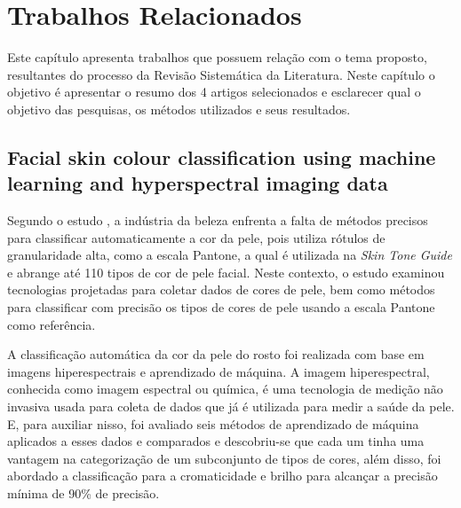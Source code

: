 \chapter{Trabalhos Relacionados}
\label{cap:trabalhos-relacionados}
Este capítulo apresenta trabalhos que possuem relação com o tema proposto, resultantes do processo da Revisão Sistemática da Literatura. Neste capítulo o objetivo é apresentar o resumo dos 4 artigos selecionados e esclarecer qual o objetivo das pesquisas, os métodos utilizados e seus resultados.

\section{Facial skin colour classification using machine learning and hyperspectral imaging data} 

Segundo o estudo \cite{Facial_skin_colour_classification_using_machine_learning_and_hyperspectral_imaging_data}, a indústria da beleza enfrenta a falta de métodos precisos para classificar automaticamente a cor da pele, pois utiliza rótulos de granularidade alta, como a escala Pantone, a qual é utilizada na \textit{Skin Tone Guide} e abrange até 110 tipos de cor de pele facial. Neste contexto, o estudo examinou tecnologias projetadas para coletar dados de cores de pele, bem como métodos para classificar com precisão os tipos de cores de pele usando a escala Pantone como referência.
 

A classificação automática da cor da pele do rosto foi realizada com base em imagens hiperespectrais e aprendizado de máquina.  A imagem hiperespectral, conhecida como imagem espectral ou química, é uma tecnologia de medição não invasiva usada para coleta de dados que já é utilizada para medir a saúde da pele. E, para auxiliar nisso, foi avaliado seis métodos de aprendizado de máquina aplicados a esses dados e comparados e descobriu-se que cada um tinha uma vantagem na categorização de um subconjunto de tipos de cores, além disso, foi abordado a classificação para a cromaticidade e brilho para alcançar a precisão mínima de 90\% de precisão.

